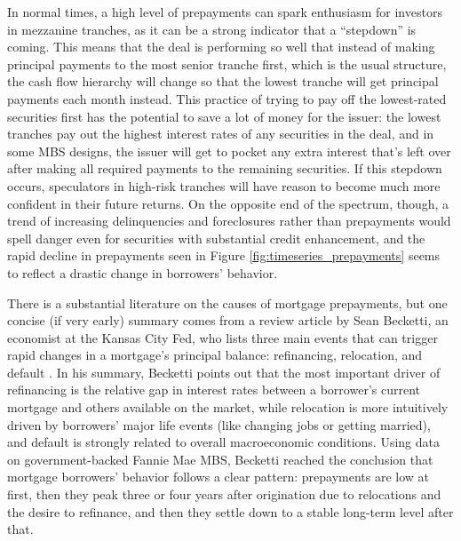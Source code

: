 \documentclass[12pt]{article}
\begin{document}
In normal times, a high level of prepayments can spark enthusiasm for investors in mezzanine tranches, as it can be a strong indicator that a “stepdown” is coming. This means that the deal is performing so well that instead of making principal payments to the most senior tranche first, which is the usual structure, the cash flow hierarchy will change so that the lowest tranche will get principal payments each month instead. This practice of trying to pay off the lowest-rated securities first has the potential to save a lot of money for the issuer: the lowest tranches pay out the highest interest rates of any securities in the deal, and in some MBS designs, the issuer will get to pocket any extra interest that’s left over after making all required payments to the remaining securities. If this stepdown occurs, speculators in high-risk tranches will have reason to become much more confident in their future returns. On the opposite end of the spectrum, though, a trend of increasing delinquencies and foreclosures rather than prepayments would spell danger even for securities with substantial credit enhancement, and the rapid decline in prepayments seen in Figure \ref{fig:timeseries_prepayments} seems to reflect a drastic change in borrowers’ behavior.

	There is a substantial literature on the causes of mortgage prepayments, but one concise (if very early) summary comes from a review article by Sean Becketti, an economist at the Kansas City Fed, who lists three main events that can trigger rapid changes in a mortgage’s principal balance: refinancing, relocation, and default \parencite{becketti89}. In his summary, Becketti points out that the most important driver of refinancing is the relative gap in interest rates between a borrower’s current mortgage and others available on the market, while relocation is more intuitively driven by borrowers’ major life events (like changing jobs or getting married), and default is strongly related to overall macroeconomic conditions. Using data on government-backed Fannie Mae MBS, Becketti reached the conclusion that mortgage borrowers’ behavior follows a clear pattern: prepayments are low at first, then they peak three or four years after origination due to relocations and the desire to refinance, and then they settle down to a stable long-term level after that.
	
\end{document}
